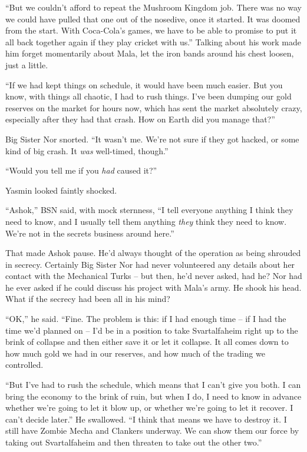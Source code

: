 ``But we couldn't afford to repeat the Mushroom Kingdom job. There
was no way we could have pulled that one out of the nosedive, once
it started. It was doomed from the start. With Coca-Cola's games,
we have to be able to promise to put it all back together again if
they play cricket with us.'' Talking about his work made him forget
momentarily about Mala, let the iron bands around his chest loosen,
just a little.

``If we had kept things on schedule, it would have been much easier.
But you know, with things all chaotic, I had to rush things. I've
been dumping our gold reserves on the market for hours now, which
has sent the market absolutely crazy, especially after they had
that crash. How on Earth did you manage that?''

Big Sister Nor snorted. ``It wasn't me. We're not sure if they got
hacked, or some kind of big crash. It \emph{was} well-timed,
though.''

``Would you tell me if you \emph{had} caused it?''

Yasmin looked faintly shocked.

``Ashok,'' BSN said, with mock sternness, ``I tell everyone anything I
think they need to know, and I usually tell them anything
\emph{they} think they need to know. We're not in the secrets
business around here.''

That made Ashok pause. He'd always thought of the operation as
being shrouded in secrecy. Certainly Big Sister Nor had never
volunteered any details about her contact with the Mechanical Turks
-- but then, he'd never asked, had he? Nor had he ever asked if he
could discuss his project with Mala's army. He shook his head. What
if the secrecy had been all in his mind?

``OK,'' he said. ``Fine. The problem is this: if I had enough time --
if I had the time we'd planned on -- I'd be in a position to take
Svartalfaheim right up to the brink of collapse and then either
save it or let it collapse. It all comes down to how much gold we
had in our reserves, and how much of the trading we controlled.

``But I've had to rush the schedule, which means that I can't give
you both. I can bring the economy to the brink of ruin, but when I
do, I need to know in advance whether we're going to let it blow
up, or whether we're going to let it recover. I can't decide
later.'' He swallowed. ``I think that means we have to destroy it. I
still have Zombie Mecha and Clankers underway. We can show them our
force by taking out Svartalfaheim and then threaten to take out the
other two.''

